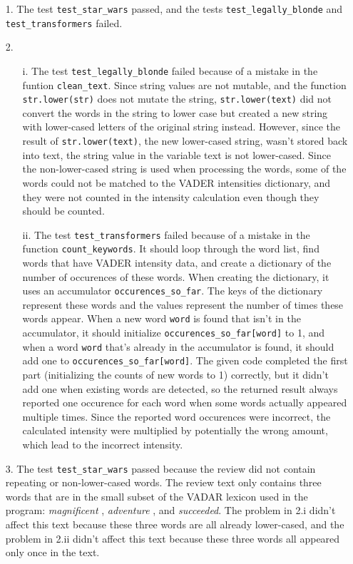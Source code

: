 \documentclass[fontsize=11pt]{article}
\begin{document}
\begin{enumerate}
\item[1.]
The test \texttt{test\_star\_wars} passed, and the tests 
\texttt{test\_legally\_blonde} and \texttt{test\_transformers} failed.

\item[2.]
\begin{enumerate}
    \item[i.] The test \texttt{test\_legally\_blonde} failed because of a mistake in the funtion \texttt{clean\_text}. Since string values are not mutable, and the function \texttt{str.lower(str)} does not mutate the string, \texttt{str.lower(text)} did not convert the words in the string to lower case but created a new string with lower-cased letters of the original string instead. However, since the result of \texttt{str.lower(text)}, the new lower-cased string, wasn't stored back into text, the string value in the variable text is not lower-cased. Since the non-lower-cased string is used when processing the words, some of the words could not be matched to the VADER intensities dictionary, and they were not counted in the intensity calculation even though they should be counted.
    \item[ii.] The test \texttt{test\_transformers} failed because of a mistake in the function \texttt{count\_keywords}. It should loop through the word list, find words that have VADER intensity data, and create a dictionary of the number of occurences of these words. When creating the dictionary, it uses an accumulator \texttt{occurences\_so\_far}. The keys of the dictionary represent these words and the values represent the number of times these words appear. When a new word \texttt{word} is found that isn't in the accumulator, it should initialize \texttt{occurences\_so\_far[word]} to 1, and when a word \texttt{word} that's already in the accumulator is found, it should add one to \texttt{occurences\_so\_far[word]}. The given code completed the first part (initializing the counts of new words to 1) correctly, but it didn't add one when existing words are detected, so the returned result always reported one occurence for each word when some words actually appeared multiple times. Since the reported word occurences were incorrect, the calculated intensity were multiplied by potentially the wrong amount, which lead to the incorrect intensity.
\end{enumerate} 

\item[3.]
The test \texttt{test\_star\_wars} passed because the review did not contain repeating or non-lower-cased words. The review text only contains three words that are in the small subset of the VADAR lexicon used in the program: \textit{magnificent} , \textit{adventure} , and \textit{succeeded}. The problem in 2.i didn't affect this text because these three words are all already lower-cased, and the problem in 2.ii didn't affect this text because these three words all appeared only once in the text. 
\end{enumerate}
\end{document}
